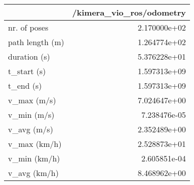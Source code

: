 \begin{tabular}{lr}
\toprule
{} &  /kimera\_vio\_ros/odometry \\
\midrule
nr. of poses    &              2.170000e+02 \\
path length (m) &              1.264774e+02 \\
duration (s)    &              5.376228e+01 \\
t\_start (s)     &              1.597313e+09 \\
t\_end (s)       &              1.597313e+09 \\
v\_max (m/s)     &              7.024647e+00 \\
v\_min (m/s)     &              7.238476e-05 \\
v\_avg (m/s)     &              2.352489e+00 \\
v\_max (km/h)    &              2.528873e+01 \\
v\_min (km/h)    &              2.605851e-04 \\
v\_avg (km/h)    &              8.468962e+00 \\
\bottomrule
\end{tabular}
